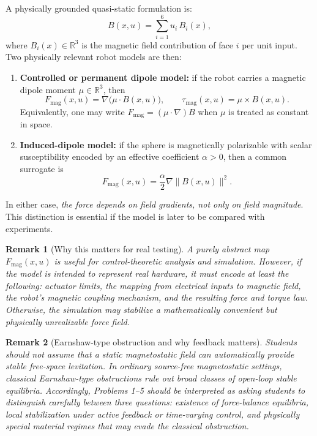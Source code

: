 \documentclass[11pt]{article}
\newtheorem{remark}{Remark}
\begin{document}
A physically grounded quasi-static formulation is:
\[
B(x,u)=\sum_{i=1}^6 u_i\,B_i(x),
\]
where $B_i(x)\in\mathbb{R}^3$ is the magnetic field contribution of face $i$ per unit input. Two physically relevant robot models are then:
\begin{enumerate}[label=(\alph*), leftmargin=1.8em]
    \item \textbf{Controlled or permanent dipole model:} if the robot carries a magnetic dipole moment $\mu\in\mathbb{R}^3$, then
    \[
    F_{\mathrm{mag}}(x,u)=\nabla\!\bigl(\mu\cdot B(x,u)\bigr),
    \qquad
    \tau_{\mathrm{mag}}(x,u)=\mu\times B(x,u).
    \]
    Equivalently, one may write $F_{\mathrm{mag}}=(\mu\cdot\nabla)B$ when $\mu$ is treated as constant in space.

    \item \textbf{Induced-dipole model:} if the sphere is magnetically polarizable with scalar susceptibility encoded by an effective coefficient $\alpha>0$, then a common surrogate is
    \[
    F_{\mathrm{mag}}(x,u)=\frac{\alpha}{2}\nabla \|B(x,u)\|^2.
    \]
\end{enumerate}

\noindent In either case, \emph{the force depends on field gradients, not only on field magnitude}. This distinction is essential if the model is later to be compared with experiments.

\begin{remark}[Why this matters for real testing]
A purely abstract map $F_{\mathrm{mag}}(x,u)$ is useful for control-theoretic analysis and simulation. However, if the model is intended to represent real hardware, it must encode at least the following: actuator limits, the mapping from electrical inputs to magnetic field, the robot's magnetic coupling mechanism, and the resulting force and torque law. Otherwise, the simulation may stabilize a mathematically convenient but physically unrealizable force field.
\end{remark}

\begin{remark}[Earnshaw-type obstruction and why feedback matters]
Students should not assume that a static magnetostatic field can automatically provide stable free-space levitation. In ordinary source-free magnetostatic settings, classical Earnshaw-type obstructions rule out broad classes of open-loop stable equilibria. Accordingly, Problems 1--5 should be interpreted as asking students to distinguish carefully between three questions: existence of force-balance equilibria, local stabilization under active feedback or time-varying control, and physically special material regimes that may evade the classical obstruction.
\end{remark}
\end{document}
